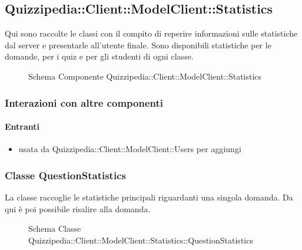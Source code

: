 \subsection{Quizzipedia::Client::ModelClient::Statistics}
Qui sono raccolte le classi con il compito di reperire informazioni sulle statistiche dal server e presentarle all'utente finale. Sono disponibili statistiche per le domande, per i quiz e per gli studenti di ogni classe.
\begin{figure}[H]
\centering
\noindent{}
\caption[Schema Componente Quizzipedia::Client::ModelClient::Statistics]{Schema Componente Quizzipedia::Client::ModelClient::Statistics}
\end{figure}
\subsubsection{Interazioni con altre componenti}
\paragraph{Entranti}
\begin{itemize}
\item usata da Quizzipedia::Client::ModelClient::Users per aggiungi
\end{itemize}
\subsubsection{Classe QuestionStatistics}
La classe raccoglie le statistiche principali riguardanti una singola domanda. Da qui è poi possibile risalire alla domanda.
\begin{figure}[H]
\centering
\noindent{}
\caption[Schema Classe QuestionStatistics]{Schema Classe Quizzipedia::Client::ModelClient::Statistics::QuestionStatistics}
\end{figure}
